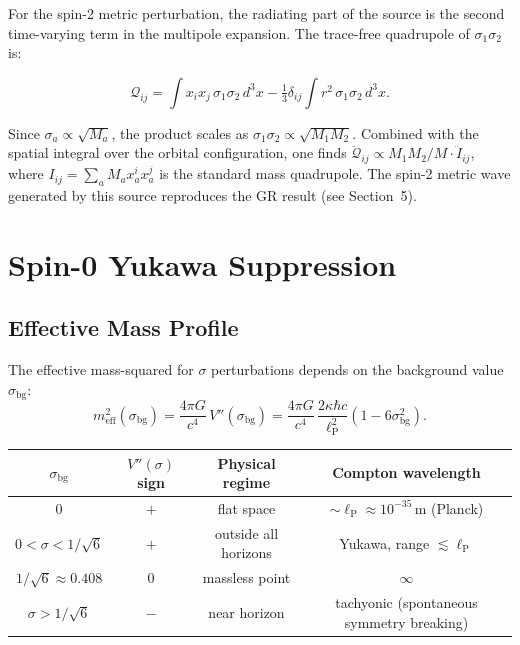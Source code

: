 \documentclass[12pt,a4paper]{article}
\newcommand{\lP}{\ell_{\mathrm{P}}}
\begin{document}
For the spin-2 metric perturbation, the radiating part of the source
is the second time-varying term in the multipole expansion.
The trace-free quadrupole of $\sigma_1\sigma_2$ is:

\begin{equation}
  \mathcal{Q}_{ij} = \int x_i x_j\,\sigma_1\sigma_2\,d^3x
    - \tfrac{1}{3}\delta_{ij}\int r^2\,\sigma_1\sigma_2\,d^3x.
\end{equation}

Since $\sigma_a \propto \sqrt{M_a}$, the product scales as
$\sigma_1\sigma_2 \propto \sqrt{M_1M_2}$. Combined with the spatial integral
over the orbital configuration, one finds
$\ddot{\mathcal{Q}}_{ij} \propto M_1 M_2/M \cdot \ddot{I}_{ij}$,
where $I_{ij} = \sum_a M_a x_a^i x_a^j$ is the standard mass quadrupole.
The spin-2 metric wave generated by this source reproduces the GR result
(see Section~5).

\section{Spin-0 Yukawa Suppression}

\subsection{Effective Mass Profile}

The effective mass-squared for $\sigma$ perturbations depends on the
background value $\sigma_\mathrm{bg}$:
\begin{equation}
  m_\mathrm{eff}^2(\sigma_\mathrm{bg})
    = \frac{4\pi G}{c^4}\,V''(\sigma_\mathrm{bg})
    = \frac{4\pi G}{c^4}\,\frac{2\kappa\hbar c}{\lP^2}(1-6\sigma_\mathrm{bg}^2).
\end{equation}

\begin{center}
\renewcommand{\arraystretch}{1.15}
\begin{tabular}{cccc}
\toprule
$\sigma_\mathrm{bg}$ & $V''(\sigma)$ sign & Physical regime & Compton wavelength\\
\midrule
$0$           & $+$ & flat space       & $\sim\lP\approx10^{-35}$\,m (Planck)\\
$0<\sigma<1/\sqrt{6}$ & $+$ & outside all horizons & Yukawa, range $\lesssim\lP$\\
$1/\sqrt{6}\approx0.408$ & $0$ & massless point & $\infty$\\
$\sigma>1/\sqrt{6}$ & $-$ & near horizon & tachyonic (spontaneous symmetry breaking)\\
\bottomrule
\end{tabular}
\end{center}
\end{document}
